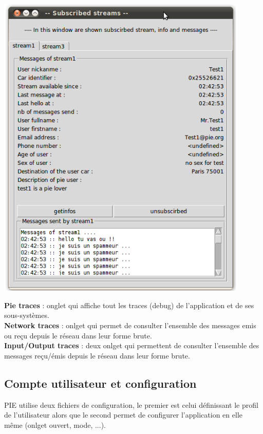 \begin{center}
    \includegraphics[width=0.9\textwidth]{img/subscribed.png}
\end{center}

\textbf{Pie traces} : onglet qui affiche tout les traces (debug) de l'application et de ses sous-systèmes.\\

\textbf{Network traces} : onlget qui permet de consulter l'ensemble des messages emis ou reçu depuis le réseau dans leur forme brute.\\

\textbf{Input/Output traces} : deux onlget qui permettent de consulter l'ensemble des messages reçu/émis depuis le réseau dans leur forme brute. \\

\subsection{Compte utilisateur et configuration}

PIE utilise deux fichiers de configuration, le premier est celui définissant le profil de l'utilisateur
alors que le second permet de configurer l'application en elle même (onlget ouvert, mode, ...).  \\

